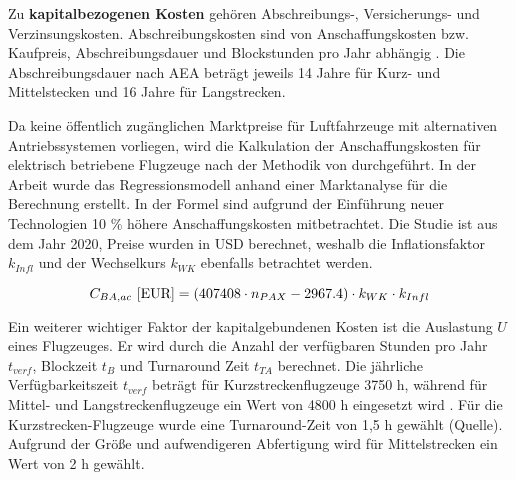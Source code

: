 
Zu \textbf{kapitalbezogenen Kosten} gehören Abschreibungs-, Versicherungs- und Verzinsungskosten. 
Abschreibungskosten sind von Anschaffungskosten bzw. Kaufpreis, 
Abschreibungsdauer und Blockstunden pro Jahr abhängig \cite{conrady2019luftverkehr}.
Die Abschreibungsdauer nach AEA beträgt jeweils 14 Jahre für 
Kurz- und Mittelstecken und 16 Jahre für Langstrecken.

Da keine öffentlich zugänglichen Marktpreise für Luftfahrzeuge mit alternativen Antriebssystemen vorliegen, 
wird die Kalkulation der Anschaffungskosten für elektrisch betriebene Flugzeuge 
nach der Methodik von \cite{monjon2020conceptual} durchgeführt. 
In der Arbeit wurde das Regressionsmodell anhand einer Marktanalyse für die Berechnung erstellt. 
In der Formel sind aufgrund der Einführung neuer Technologien 10 \% höhere Anschaffungskosten mitbetrachtet. 
Die Studie ist aus dem Jahr 2020, Preise wurden in USD berechnet, 
weshalb die Inflationsfaktor $k_{Infl}$ und der Wechselkurs $k_{WK}$ 
ebenfalls betrachtet werden.

\begin{equation}
   {C_{BA,ac} ~[\text{EUR}]} = (407408 \cdot n_{PAX} - 2967.4) \cdot k_{WK} \cdot {k_{Infl}}\\
   \label{price BA}
\end{equation}

Ein weiterer wichtiger Faktor der kapitalgebundenen Kosten ist die Auslastung $U$ eines Flugzeuges. 
Er wird durch die Anzahl der verfügbaren Stunden pro Jahr $t_{verf}$, 
Blockzeit $t_B$ und Turnaround Zeit $t_{TA}$ berechnet. 
Die jährliche Verfügbarkeitszeit $t_{verf}$ beträgt für Kurzstreckenflugzeuge 3750 h, 
während für Mittel- und Langstreckenflugzeuge ein Wert von 4800 h eingesetzt wird \cite{scholz_design_evaluation_doc}. 
Für die Kurzstrecken-Flugzeuge wurde eine Turnaround-Zeit von 1,5 h gewählt (Quelle).
Aufgrund der Größe und aufwendigeren Abfertigung wird für Mittelstrecken ein Wert von 2 h gewählt.

